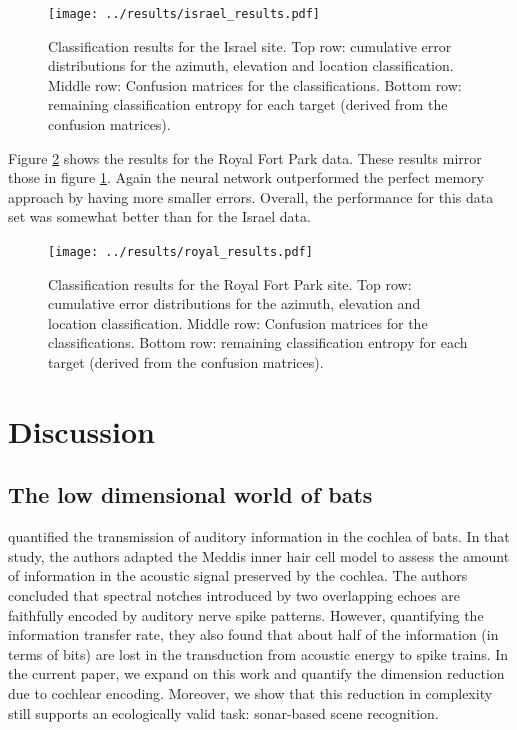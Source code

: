 \documentclass[preprint,5p]{elsarticle}
\begin{document}
\begin{figure}
	\centering
	\texttt{[image: ../results/israel\_results.pdf]}
	\caption{Classification results for the Israel site. Top row: cumulative error distributions for the azimuth, elevation and location classification. Middle row: Confusion matrices for the classifications. Bottom row: remaining classification entropy for each target (derived from the confusion matrices).}
	\label{fig:israelperformance}
\end{figure}

Figure \ref{fig:royalperformance} shows the results for the Royal Fort Park data. These results mirror those in figure \ref{fig:israelperformance}. Again the neural network outperformed the perfect memory approach by having more smaller errors. Overall, the performance for this data set was somewhat better than for the Israel data.

\begin{figure}
	\centering
	\texttt{[image: ../results/royal\_results.pdf]}
	\caption{Classification results for the Royal Fort Park site. Top row: cumulative error distributions for the azimuth, elevation and location classification. Middle row: Confusion matrices for the classifications. Bottom row: remaining classification entropy for each target (derived from the confusion matrices).}
	\label{fig:royalperformance}
\end{figure}


\section{Discussion}

\subsection{The low dimensional world of bats}

\citet{Reijniers2010a} quantified the transmission of auditory information in the cochlea of bats. In that study, the authors adapted the Meddis inner hair cell model \citep{Meddis2006} to assess the amount of information in the acoustic signal preserved by the cochlea. The authors concluded that spectral notches introduced by two overlapping echoes are faithfully encoded by auditory nerve spike patterns. However, quantifying the information transfer rate, they also found that about half of the information (in terms of bits) are lost in the transduction from acoustic energy to spike trains. In the current paper, we expand on this work and quantify the dimension reduction due to cochlear encoding. Moreover, we show that this reduction in complexity still supports an ecologically valid task: sonar-based scene recognition.
\end{document}
